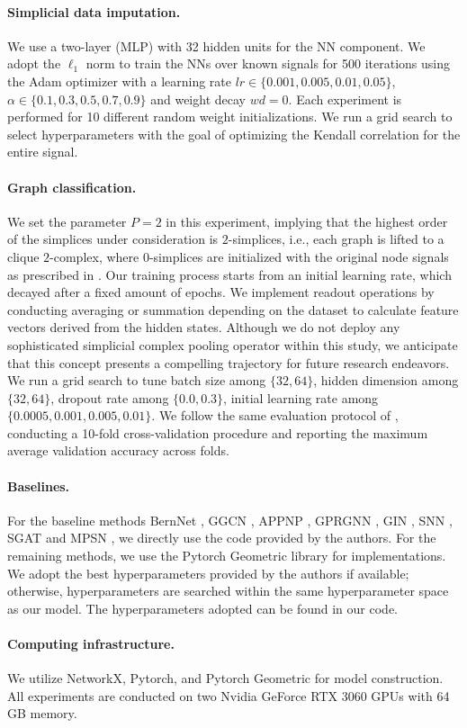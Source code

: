 \documentclass[letterpaper]{article} \usepackage{aaai24}
\theoremstyle{plain}
\theoremstyle{definition}
\theoremstyle{remark}
\begin{document}
\paragraph{Simplicial data imputation.} 
We use a two-layer (MLP) with 32 hidden units for the NN component.
We adopt the $\ell_1$ norm to train the NNs over known signals for 500 iterations using the Adam optimizer with a learning rate  $ lr \in \{0.001, 0.005,  0.01, 0.05\}$, $\alpha \in \{0.1,0.3,0.5,0.7,0.9\}$ and weight decay $wd=0$. Each experiment is performed for 10 different random weight initializations.
We run a grid search to select hyperparameters with the goal of optimizing the Kendall correlation for the entire signal.


\paragraph{Graph classification.}
We set the parameter $P=2$ in this experiment, implying that the highest order of the simplices under consideration is $2$-simplices, i.e., each graph is lifted to a clique $2$-complex, where $0$-simplices are initialized with the original node signals as prescribed in \cite{GIN2019}. 
Our training process starts from an initial learning rate, which decayed after a fixed amount of epochs.
We implement readout operations by conducting averaging or summation depending on the dataset to calculate feature vectors derived from the hidden states. Although we do not deploy any sophisticated simplicial complex pooling operator within this study, we anticipate that this concept presents a compelling trajectory for future research endeavors.
We run a grid search to tune batch size among $\{32, 64\}$, hidden dimension among $\{32, 64\}$, dropout rate among $\{0.0, 0.3\}$, initial learning rate among $\{0.0005, 0.001, 0.005, 0.01\}$.  
We follow the same evaluation protocol of \cite{GIN2019}, conducting a 10-fold cross-validation procedure and reporting the maximum average validation accuracy across folds.


\paragraph{Baselines.}
For the baseline methods BernNet \cite{BernNet}, GGCN \cite{GGCN}, APPNP \cite{APPNP}, GPRGNN \cite{GPRGNN}, GIN \cite{GIN2019}, SNN \cite{SNN2020}, SGAT \cite{SGAT} and MPSN \cite{SWL2021}, we directly use the code provided by the authors. 
For the remaining methods, we use the Pytorch Geometric library \cite{graphwithPyTorch2019} for implementations. 
We adopt the best hyperparameters provided by the authors if available; otherwise, hyperparameters are searched within the same hyperparameter space as our model. The hyperparameters adopted can be found in our code.



\paragraph{Computing infrastructure.} 
We utilize NetworkX, Pytorch, and Pytorch Geometric for model construction. All experiments are conducted on two Nvidia GeForce RTX 3060 GPUs with 64 GB memory.
\end{document}
